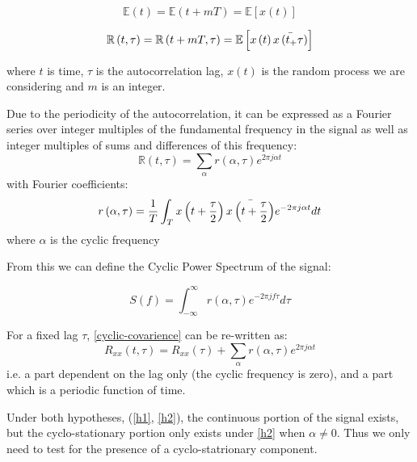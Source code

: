 \begin{equation}
\mathbb{E}\left(t\right) = \mathbb{E}\left(t + mT\right) = \mathbb{E}\left[x\left(t\right)\right]
\end{equation}

\begin{equation}
\mathbb{R}\left(t, \tau\right) = \mathbb{R}\left(t + mT, \tau\right) = \mathbb{E}\left[x\left(t\right)\bar{x\left(t_+\tau\right)}\right]
\end{equation}

where \(t\) is time, \(\tau\) is the autocorrelation lag, \(x\left(t\right)\) is the random process we are considering and \(m\) is an integer. 

Due to the periodicity of the autocorrelation, it can be expressed as a Fourier series over integer multiples of the fundamental frequency in the signal as well as integer multiples of sums and differences of this frequency:
%
\begin{equation}
\mathbb{R}\left(t, \tau\right) = \sum_{\alpha} r\left(\alpha, \tau\right) e^{2\pi j \alpha t}  
\end{equation}
\label{cyclic-covarience}
%
with Fourier coefficients:
%
\begin{equation}
r\left(\alpha, \tau\right) = \frac{1}{T} \int_{T} x\left(t+\frac{\tau}{2}\right)\bar{x\left(t+\frac{\tau}{2}\right)} e^{-2\pi j \alpha t} dt
\end{equation}
%
where \(\alpha\) is the cyclic frequency

From this we can define the Cyclic Power Spectrum of the signal:

\begin{equation}
S\left(f\right) = \int_{-\infty}^{\infty} r\left(\alpha, \tau\right) e^{-2 \pi j f \tau} d\tau
\end{equation}

For a fixed lag \(\tau\), \ref{cyclic-covarience} can be re-written as:
%
\begin{equation}
R_{xx}\left(t, \tau \right) = R_{xx}\left(\tau\right) + \sum_{\alpha} r\left(\alpha, \tau\right) e^{2\pi j \alpha t}  
\end{equation}
%
i.e. a part dependent on the lag only (the cyclic frequency is zero), and a part which is a periodic function of time. 

Under both hypotheses, (\ref{h1}, \ref{h2}), the continuous portion of the signal exists, but the cyclo-stationary portion only exists under \ref{h2} when \(\alpha \neq 0\). Thus we only need to test for the presence of a cyclo-statrionary component. 

